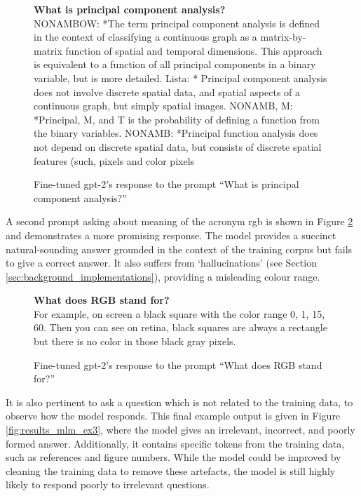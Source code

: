 \begin{figure}[ht!]
    \begin{itquote}
        \textbf{What is principal component analysis?} \\ NONAMBOW: *The term principal component analysis is defined in the context of classifying a continuous graph as a matrix-by-matrix function of spatial and temporal dimensions. This approach is equivalent to a function of all principal components in a binary variable, but is more detailed. Lista: * Principal component analysis does not involve discrete spatial data, and spatial aspects of a continuous graph, but simply spatial images. NONAMB, M: *Principal, M, and T is the probability of defining a function from the binary variables. NONAMB: *Principal function analysis does not depend on discrete spatial data, but consists of discrete spatial features (such, pixels and color pixels
    \end{itquote}
    \caption{Fine-tuned \acrshort{gpt}-2's response to the prompt ``What is principal component analysis?''}
    \label{fig:results_mlm_ex1}
\end{figure}

A second prompt asking about meaning of the acronym \acrshort{rgb} is shown in Figure \ref{fig:results_mlm_ex2} and demonstrates a more promising response. The model provides a succinct natural-sounding answer grounded in the context of the training corpus but fails to give a correct answer. It also suffers from `hallucinations' (see Section \ref{sec:background_implementations}), providing a misleading colour range.

\begin{figure}[ht!]
    \begin{itquote}
        \textbf{What does RGB stand for?} \\
       For example, on screen a black square with the color range 0, 1, 15, 60.
        Then you can see on retina, black squares are always a rectangle but there is no color in those
        black gray pixels.
    \end{itquote}
    \caption{Fine-tuned \acrshort{gpt}-2's response to the prompt ``What does RGB stand for?''}
    \label{fig:results_mlm_ex2}
\end{figure}

It is also pertinent to ask a question which is not related to the training data, to observe how the model responds. This final example output is given in Figure \ref{fig:results_mlm_ex3}, where the model gives an irrelevant, incorrect, and poorly formed answer. Additionally, it contains specific tokens from the training data, such as references and figure numbers. While the model could be improved by cleaning the training data to remove these artefacts, the model is still highly likely to respond poorly to irrelevant questions.

